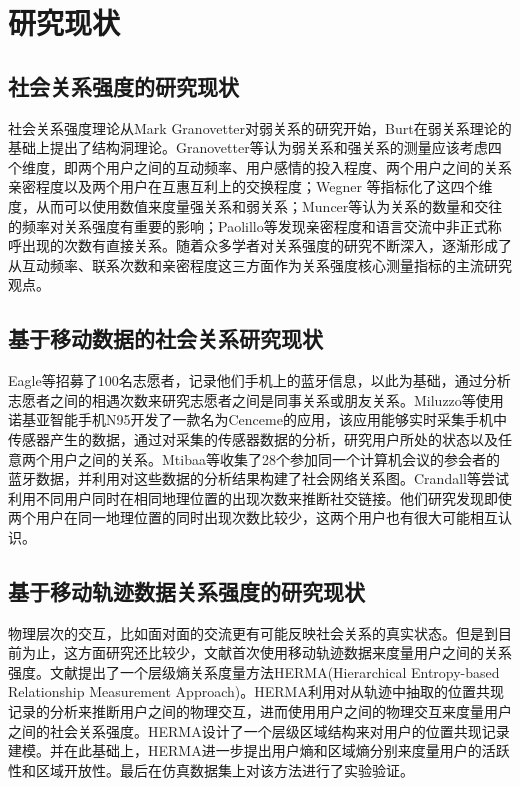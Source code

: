 \section{研究现状}
\subsection{社会关系强度的研究现状}
社会关系强度理论从Mark Granovetter对弱关系的研究开始，Burt在弱关系理论的基础上提出了结构洞理论。Granovetter等认为弱关系和强关系的测量应该考虑四个维度，即两个用户之间的互动频率、用户感情的投入程度、两个用户之间的关系亲密程度以及两个用户在互惠互利上的交换程度；Wegner 等指标化了这四个维度，从而可以使用数值来度量强关系和弱关系；Muncer等认为关系的数量和交往的频率对关系强度有重要的影响；Paolillo等发现亲密程度和语言交流中非正式称呼出现的次数有直接关系。随着众多学者对关系强度的研究不断深入，逐渐形成了从互动频率、联系次数和亲密程度这三方面作为关系强度核心测量指标的主流研究观点。

\subsection{基于移动数据的社会关系研究现状}
Eagle等招募了100名志愿者，记录他们手机上的蓝牙信息，以此为基础，通过分析志愿者之间的相遇次数来研究志愿者之间是同事关系或朋友关系。Miluzzo等使用诺基亚智能手机N95开发了一款名为Cenceme的应用，该应用能够实时采集手机中传感器产生的数据，通过对采集的传感器数据的分析，研究用户所处的状态以及任意两个用户之间的关系。Mtibaa等收集了28个参加同一个计算机会议的参会者的蓝牙数据，并利用对这些数据的分析结果构建了社会网络关系图。Crandall等尝试利用不同用户同时在相同地理位置的出现次数来推断社交链接。他们研究发现即使两个用户在同一地理位置的同时出现次数比较少，这两个用户也有很大可能相互认识。

\subsection{基于移动轨迹数据关系强度的研究现状}
物理层次的交互，比如面对面的交流更有可能反映社会关系的真实状态。但是到目前为止，这方面研究还比较少，文献\cite{ma2014effective}首次使用移动轨迹数据来度量用户之间的关系强度。文献\cite{ma2014effective}提出了一个层级熵关系度量方法HERMA(Hierarchical Entropy-based Relationship Measurement Approach)。HERMA利用对从轨迹中抽取的位置共现记录的分析来推断用户之间的物理交互，进而使用用户之间的物理交互来度量用户之间的社会关系强度。HERMA设计了一个层级区域结构来对用户的位置共现记录建模。并在此基础上，HERMA进一步提出用户熵和区域熵分别来度量用户的活跃性和区域开放性。最后在仿真数据集上对该方法进行了实验验证。

